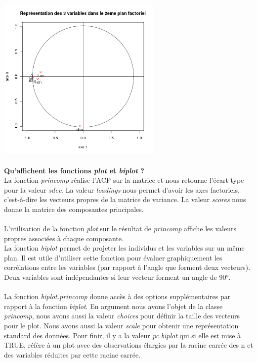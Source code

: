 \documentclass[a4paper, 10pt]{article}
\begin{document}
\includegraphics[height = 8cm, width = 8cm]{plots/plot_correlation_notes_2.png}\\ \\
\textbf{Qu'affichent les fonctions \textit{plot} et \textit{biplot} ?}\\
La fonction \textit{princomp} r\'ealise l'ACP sur la matrice et nous retourne l'\'ecart-type pour la valeur \textit{sdev}.
La valeur \textit{loadings} nous permet d'avoir les axes factoriels, c'est-\`a-dire les vecteurs propres de la matrice de variance.
La valeur \textit{scores} nous donne la matrice des composantes principales.\\ \\
L'utilisation de la fonction \textit{plot} sur le r\'esultat de \textit{princomp} affiche les valeurs propres associ\'ees \`a chaque composante.\\
La fonction \textit{biplot} permet de projeter les individus et les variables sur un m\^eme plan.
Il est utile d'utiliser cette fonction pour \'evaluer graphiquement les corr\'elations entre les variables (par rapport \`a l'angle que forment
deux vecteurs). Deux variables sont ind\'ependantes si leur vecteur forment un angle de 90°.\\ \\
La fonction \textit{biplot.princomp} donne acc\`es \`a des options suppl\'ementaires par rapport \`a la fonction \textit{biplot}.
En argument nous avons l'objet de la classe \textit{princomp}, nous avons aussi la valeur \textit{choices} pour d\'efinir la taille des vecteurs
pour le plot. Nous avons aussi la valeur \textit{scale} pour obtenir une repr\'esentation standard des donn\'ees.
Pour finir, il y a la valeur \textit{pc.biplot} qui si elle est mise \`a TRUE, r\'ef\`ere \`a un plot avec des observations \'elargies par
la racine carr\'ee des n et des variables r\'eduites par cette racine carr\'ee.
\end{document}
